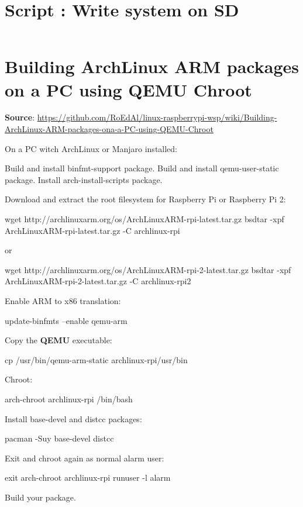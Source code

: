 \documentclass[11pt,a4paper,oneside]{report}
\begin{document}
\begin{appendices}
  \chapter{Script : Write system on SD}\label{write_system_sd}

  \inputminted[xleftmargin=20pt, linenos=true, breaklines=true, frame=single, framesep=6pt, tabsize=2, fontfamily=courier, fontsize=\small]{bash}{../write_system_on_sd.sh}
  
  \chapter{Building ArchLinux ARM packages on a PC using QEMU Chroot}\label{archlinux_arm_qemu_chroot}
  
\textbf{Source}: \url{https://github.com/RoEdAl/linux-raspberrypi-wsp/wiki/Building-ArchLinux-ARM-packages-ona-a-PC-using-QEMU-Chroot}

On a PC witch ArchLinux or Manjaro installed:

Build and install binfmt-support package.
Build and install qemu-user-static package.
Install arch-install-scripts package.

Download and extract the root filesystem for Raspberry Pi or Raspberry Pi 2:

\begin{bashcode}
wget http://archlinuxarm.org/os/ArchLinuxARM-rpi-latest.tar.gz   
bsdtar -xpf ArchLinuxARM-rpi-latest.tar.gz -C archlinux-rpi
\end{bashcode}

or

\begin{bashcode}
wget http://archlinuxarm.org/os/ArchLinuxARM-rpi-2-latest.tar.gz   
bsdtar -xpf ArchLinuxARM-rpi-2-latest.tar.gz -C archlinux-rpi2
\end{bashcode}

Enable ARM to x86 translation:

\begin{bashcode}    
update-binfmts --enable qemu-arm
\end{bashcode}


Copy the \textbf{QEMU} executable:

\begin{bashcode}
cp /usr/bin/qemu-arm-static archlinux-rpi/usr/bin
\end{bashcode}


Chroot:

\begin{bashcode}
arch-chroot archlinux-rpi /bin/bash
\end{bashcode}


Install base-devel and distcc packages:

\begin{bashcode}
pacman -Suy base-devel distcc
\end{bashcode}


Exit and chroot again as normal alarm user:

\begin{bashcode}
exit
arch-chroot archlinux-rpi runuser -l alarm
\end{bashcode}


Build your package.

\end{appendices}
\end{document}
